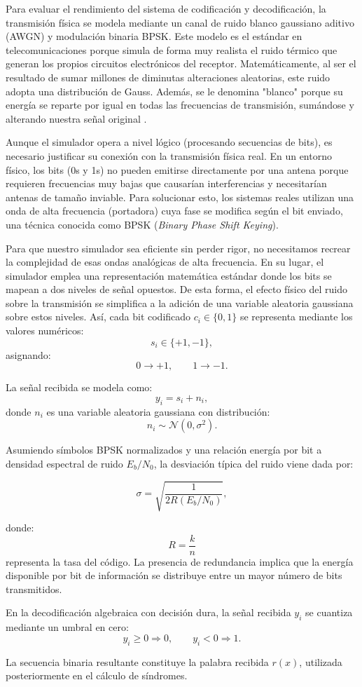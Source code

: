 Para evaluar el rendimiento del sistema de codificación y decodificación, la transmisión física se modela mediante un canal de ruido blanco gaussiano aditivo (AWGN) y modulación binaria BPSK. Este modelo es el estándar en telecomunicaciones porque simula de forma muy realista el ruido térmico que generan los propios circuitos electrónicos del receptor. Matemáticamente, al ser el resultado de sumar millones de diminutas alteraciones aleatorias, este ruido adopta una distribución de Gauss. Además, se le denomina "blanco" porque su energía se reparte por igual en todas las frecuencias de transmisión, sumándose y alterando nuestra señal original \cite{artes2012comunicaciones}.

Aunque el simulador opera a nivel lógico (procesando secuencias de bits), es necesario justificar su conexión con la transmisión física real. En un entorno físico, los bits (0s y 1s) no pueden emitirse directamente por una antena porque requieren frecuencias muy bajas que causarían interferencias y necesitarían antenas de tamaño inviable. Para solucionar esto, los sistemas reales utilizan una onda de alta frecuencia (portadora) cuya fase se modifica según el bit enviado, una técnica conocida como BPSK (\textit{Binary Phase Shift Keying}).

Para que nuestro simulador sea eficiente sin perder rigor, no necesitamos recrear la complejidad de esas ondas analógicas de alta frecuencia. En su lugar, el simulador emplea una representación matemática estándar donde los bits se mapean a dos niveles de señal opuestos. De esta forma, el efecto físico del ruido sobre la transmisión se simplifica a la adición de una variable aleatoria gaussiana sobre estos niveles. Así, cada bit codificado \(c_i \in \{0,1\}\) se representa mediante los valores numéricos:
\[
s_i \in \{+1,-1\},
\]
asignando:
\[
0 \rightarrow +1,
\qquad
1 \rightarrow -1.
\]

La señal recibida se modela como:
\[
y_i = s_i + n_i,
\]
donde \(n_i\) es una variable aleatoria gaussiana con distribución:
\[
n_i \sim \mathcal{N}(0,\sigma^2).
\]

Asumiendo símbolos BPSK normalizados y una relación energía por bit a densidad espectral de ruido \(E_b/N_0\), la desviación típica del ruido viene dada por:

\begin{equation}
\sigma =
\sqrt{
\frac{1}{
2R\left(E_b/N_0\right)
}
},
\end{equation}

donde:
\[
R = \frac{k}{n}
\]
representa la tasa del código. La presencia de redundancia implica que la energía disponible por bit de información se distribuye entre un mayor número de bits transmitidos.

En la decodificación algebraica con decisión dura, la señal recibida \(y_i\) se cuantiza mediante un umbral en cero:
\[
y_i \geq 0 \Rightarrow 0,
\qquad
y_i < 0 \Rightarrow 1.
\]

La secuencia binaria resultante constituye la palabra recibida \(r(x)\), utilizada posteriormente en el cálculo de síndromes.
